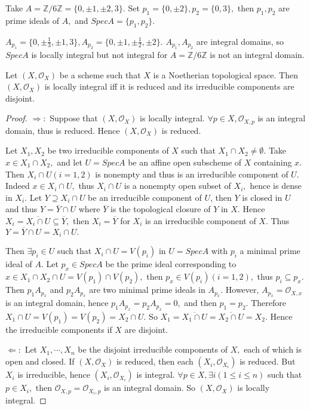 \begin{eg}
Take $A=\mathbb{Z}/6\mathbb{Z}=\{0,\pm 1,\pm 2,3\}.$ Set
$p_1=\{0,\pm 2\}, p_2=\{0,3\},$ then $p_1, p_2$ are prime ideals of
$A,$ and $SpecA=\{p_1,p_2\}.$

$A_{p_1}=\{0,\pm\frac{1}{3},\pm 1,3\}, A_{p_2}=\{0,\pm
1,\pm\frac{1}{2},\pm 2\}.$ $A_{p_1}, A_{p_2}$ are integral domains,
so $SpecA$ is locally integral but not integral for
$A=\mathbb{Z}/6\mathbb{Z}$ is not an integral domain.
\end{eg}
\begin{prop}
Let $(X, \mathcal {O}_X)$ be a scheme such that $X$ is a Noetherian
topological space. Then $(X, \mathcal {O}_X)$ is locally integral
iff it is reduced and its irreducible components are disjoint.
\end{prop}
\begin{proof}
$\Longrightarrow:$ Suppose that $(X, \mathcal {O}_X)$ is locally
integral. $\forall p\in X, \mathcal {O}_{X,p}$ is an integral
domain, thus is reduced. Hence $(X, \mathcal {O}_X)$ is reduced.

Let $X_1, X_2$ be two irreducible components of $X$ such that
$X_1\cap X_2\neq\emptyset.$ Take $x\in X_1\cap X_2,$ and let
$U=SpecA$ be an affine open subscheme of $X$ containing $x.$ Then
$X_i\cap U(i=1,2)$ is nonempty and thus is an irreducible component
of $U.$ Indeed $x\in X_i\cap U,$ thus $X_i\cap U$ is a nonempty open
subset of $X_i,$ hence is dense in $X_i.$ Let $Y\supseteq X_i\cap U$
be an irreducible component of $U$, then $Y$ is closed in $U$ and
thus $Y=\overline{Y}\cap U$ where $\overline{Y}$ is the topological
closure of $Y$ in $X.$ Hence $X_i=\overline{X_i\cap
U}\subseteq\overline{Y},$ then $X_i=\overline{Y}$ for $X_i$ is an
irreducible component of $X.$ Thus $Y=\overline{Y}\cap U=X_i\cap U.$

Then $\exists p_i\in U$ such that $X_i\cap U=V(p_i)$ in $U=SpecA$
with $p_i$ a minimal prime ideal of $A.$ Let $p_x\in SpecA$ be the
prime ideal corresponding to $x\in X_1\cap X_2\cap U=V(p_1)\cap
V(p_2),$ then $p_x\in V(p_i)(i=1,2),$ thus $p_i\subseteq p_x.$ Then
$p_1A_{p_x}$ and $p_2A_{p_x}$ are two minimal prime ideals in
$A_{p_x}.$ However, $A_{p_x}=\mathcal {O}_{X,x}$ is an integral
domain, hence $p_1A_{p_x}=p_2A_{p_x}=0,$ and then $p_1=p_2.$
Therefore $X_1\cap U=V(p_1)=V(p_2)=X_2\cap U.$ So
$X_1=\overline{X_1\cap U}=\overline{X_2\cap U}=X_2.$ Hence the
irreducible components if $X$ are disjoint.

$\Longleftarrow:$ Let $X_1,\cdots,X_n$ be the disjoint irreducible
components of $X,$ each of which is open and closed. If $(X,\mathcal
{O}_X)$ is reduced, then each $(X_i,\mathcal {O}_{X_i})$ is reduced.
But $X_i$ is irreducible, hence $(X_i,\mathcal {O}_{X_i})$ is
integral. $\forall p\in X,\exists i(1\leqslant i\leqslant n)$ such
that $p\in X_i,$ then $\mathcal {O}_{X,p}=\mathcal {O}_{X_i,p}$ is
an integral domain. So $(X,\mathcal {O}_X)$ is locally integral.
\end{proof}
